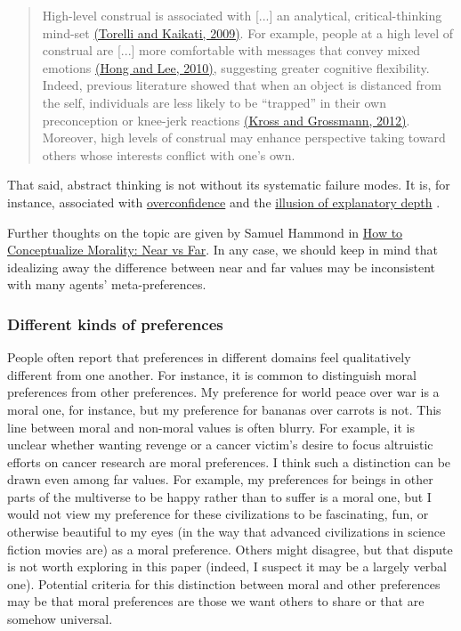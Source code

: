 \begin{quote}
High-level construal is associated with {[}...{]} an analytical,
critical-thinking mind-set
\href{http://citeseerx.ist.psu.edu/viewdoc/download?doi=10.1.1.186.6465\&rep=rep1\&type=pdf}{(Torelli
and Kaikati, 2009)}. For example, people at a high level of construal
are {[}...{]} more comfortable with messages that convey mixed emotions
\href{http://www.bm.ust.hk/mark/staff/Jiewen/Jiewen\%20JCR-Oct\%202010.pdf}{(Hong
and Lee, 2010)}, suggesting greater cognitive flexibility. Indeed,
previous literature showed that when an object is distanced from the
self, individuals are less likely to be ``trapped'' in their own
preconception or knee-jerk reactions
\href{https://uwaterloo.ca/wisdom-and-culture-lab/sites/ca.wisdom-and-culture-lab/files/uploads/files/kross_grossmann_jepg_2012.pdf}{(Kross
and Grossmann, 2012)}. Moreover, high levels of construal may enhance
perspective taking toward others whose interests conflict with one's
own.
\end{quote}

That said, abstract thinking is not without its systematic failure
modes. It is, for instance, associated with
\href{https://en.wikipedia.org/wiki/Overconfidence_effect}{overconfidence}
and the \href{https://www.edge.org/response-detail/27117}{illusion
of explanatory depth} \parencite{Alter2010-lu}.

Further thoughts on the topic are given by Samuel Hammond in
\href{http://abstractminutiae.com/post/85550239565/how-to-conceptualize-morality-near-vs-far}{How
to Conceptualize Morality: Near vs Far}. In any case, we should keep
in mind that idealizing away the difference between near and far values
may be inconsistent with many agents' meta-preferences.

\subsubsection{Different kinds of
preferences}\label{different-kinds-of-preferences}

People often report that preferences in different domains feel
qualitatively different from one another. For instance, it is common to
distinguish moral preferences from other preferences. My preference for
world peace over war is a moral one, for instance, but my preference for
bananas over carrots is not. This line between moral and non-moral
values is often blurry. For example, it is unclear whether wanting
revenge or a cancer victim's desire to focus altruistic efforts on
cancer research are moral preferences. I think such a distinction can be
drawn even among far values. For example, my preferences for beings in
other parts of the multiverse to be happy rather than to suffer is a
moral one, but I would not view my preference for these civilizations to
be fascinating, fun, or otherwise beautiful to my eyes (in the way that
advanced civilizations in science fiction movies are) as a moral
preference. Others might disagree, but that dispute is not worth
exploring in this paper (indeed, I suspect it may be a largely verbal
one). Potential criteria for this distinction between moral and other
preferences may be that moral preferences are those we want others to
share or that are somehow universal.


